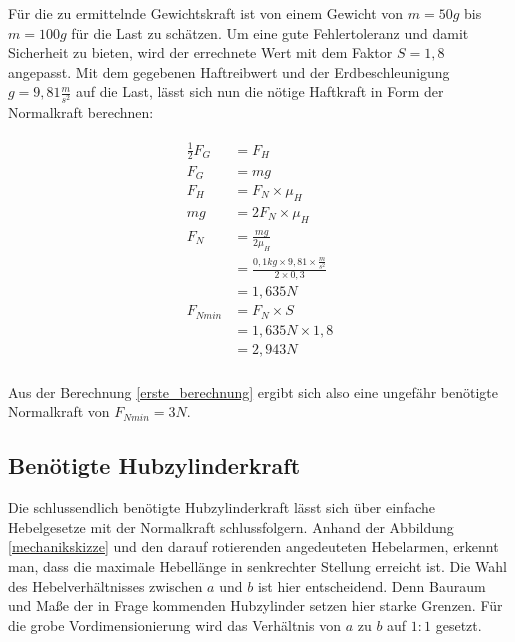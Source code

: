 \par
\newpage
Für die zu ermittelnde Gewichtskraft ist von einem Gewicht von $m=50g$ bis $m=100 g$ für die Last zu schätzen. Um eine gute Fehlertoleranz und damit Sicherheit zu bieten, wird der errechnete Wert mit dem Faktor $S = 1,8$ angepasst.
Mit dem gegebenen Haftreibwert und der Erdbeschleunigung $g = 9,81 \frac{m}{s^2}$ auf die Last, lässt sich nun die nötige Haftkraft in Form der Normalkraft berechnen:

\begin{eqnarray}
\label{erste_berechnung}
\begin{split}
\frac{1}{2}F_G &= F_H  \\
F_G &= mg \\
F_H &= F_N \times \mu_H \\
mg &= 2 F_N \times \mu_H \\
F_N &= \frac{mg}{2\mu_H} \\
	&= \frac{0,1kg\times9,81\times\frac{m}{s^2}}{2\times 0,3} \\
	&= 1,635N \\
F_{Nmin} &= F_N\times S \\
	&= 1,635N\times 1,8 \\
	&= 2,943N \\
\end{split}
\end{eqnarray}

Aus der Berechnung \eqref{erste_berechnung} ergibt sich also eine ungefähr benötigte Normalkraft von $F_{Nmin} = 3N$.

\subsection{Benötigte Hubzylinderkraft}

Die schlussendlich benötigte Hubzylinderkraft lässt sich über einfache Hebelgesetze mit der Normalkraft schlussfolgern. Anhand der Abbildung \ref{mechanikskizze} und den darauf rotierenden angedeuteten Hebelarmen, erkennt man, dass die maximale Hebellänge in senkrechter Stellung erreicht ist. Die Wahl des Hebelverhältnisses zwischen $a$ und $b$ ist hier entscheidend. Denn Bauraum und Maße der in Frage kommenden Hubzylinder setzen hier starke Grenzen. Für die grobe Vordimensionierung wird das Verhältnis von $a$ zu $b$ auf $1:1$ gesetzt.

